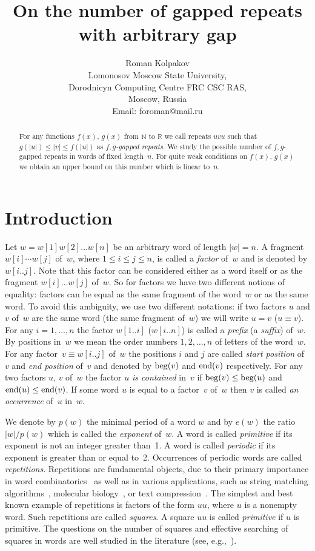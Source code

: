 \documentclass{article}
\title{On the number of gapped repeats with arbitrary gap}
\author{
        Roman Kolpakov\\
        Lomonosov Moscow State University,\\  
				Dorodnicyn Computing Centre FRC CSC RAS,\\
				Moscow, Russia\\
        Email: foroman@mail.ru
       }
\date{}
\begin{document}
\maketitle

\begin{abstract}
For any functions $f(x)$, $g(x)$ from $\mathbb {N}$ to $\mathbb {R}$
we call repeats $uvu$ such that $g(|u|)\le |v|\le f(|u|)$ as {\it $f,g$-gapped repeats}.
We study the possible number of $f,g$-gapped repeats in words of fixed length~$n$.
For quite weak conditions on $f(x)$, $g(x)$ we obtain an upper bound on this number
which is linear to~$n$.
\end{abstract}


\section{Introduction}

Let $w=w[1]w[2]\ldots w[n]$ be an arbitrary word of length $|w|=n$. 
A fragment $w[i]\cdots w[j]$ of~$w$, where $1\le i\le j\le n$, is called 
a {\it factor} of~$w$ and is denoted by $w[i..j]$. Note that this factor 
can be considered either as a word itself or as the fragment $w[i]\ldots w[j]$ 
of~$w$. So for factors we have two different notions of equality: factors 
can be equal as the same fragment of the word~$w$ or as the same word. 
To avoid this ambiguity, we use two different notations: if two factors 
$u$ and $v$ of~$w$ are the same word (the same fragment of~$w$) we will 
write $u=v$ ($u\equiv v$). For any $i=1,\ldots,n$ the factor $w[1..i]$ 
($w[i..n]$) is called a {\it prefix} (a {\it suffix}) of~$w$. By positions 
in~$w$ we mean the order numbers $1, 2,\ldots ,n$ of letters of the word~$w$. 
For any factor~$v\equiv w[i..j]$ of~$w$ the positions $i$ and $j$ are called 
{\it start position} of~$v$ and {\it end position} of~$v$ and denoted by 
${\rm beg} (v)$ and ${\rm end} (v)$ respectively. For any two factors $u$, $v$ 
of~$w$ the factor $u$ {\it is contained} in~$v$ if ${\rm beg} (v)\le {\rm beg} (u)$ 
and ${\rm end} (u)\le {\rm end} (v)$. If some word $u$ is equal to a factor~$v$ 
of~$w$ then $v$ is called {\it an occurrence} of~$u$ in~$w$.

We denote by $p(w)$ the minimal period of a word $w$ and by $e(w)$ the ratio 
$|w|/p(w)$ which is called the {\it exponent} of~$w$. A word is called {\it primitive} 
if its exponent is not an integer greater than~1. A word is called {\it periodic} 
if its exponent is greater than or equal to~2. Occurrences of periodic words are 
called {\it repetitions}. Repetitions are fundamental objects, due to their primary 
importance in word combinatorics~\cite{Lothaire83} as well as in various applications, 
such as string matching algorithms~\cite{GaliSeiferas83,CrochRytter95}, molecular 
biology~\cite{Gusfield97}, or text compression~\cite{Storer88}. The simplest 
and best known example of repetitions is factors of the form $uu$, where $u$ 
is a nonempty word. Such repetitions are called {\it squares}. A square $uu$
is called {\it primitive} if $u$ is primitive. The questions on the number of squares 
and effective searching of squares in words are well studied in the literature (see, 
e.g.,~\cite{CrochRytter95,Crochemor81,GusfStoye04}).
\end{document}
